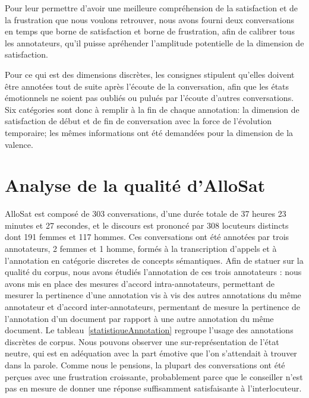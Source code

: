 Pour leur permettre d'avoir une meilleure compréhension de la satisfaction et de la frustration que nous voulons retrouver, nous avons fourni deux conversations en temps que borne de satisfaction et borne de frustration, afin de calibrer tous les annotateurs, qu'il puisse apréhender l'amplitude potentielle de la dimension de satisfaction.

Pour ce qui est des dimensions discrètes, les consignes stipulent qu'elles doivent être annotées tout de suite après l'écoute de la conversation, afin que les états émotionnels ne soient pas oubliés ou pulués par l'écoute d'autres conversations.
Six catégories sont donc à remplir à la fin de chaque annotation: la dimension de satisfaction de début et de fin de conversation avec la force de l'évolution temporaire; les mêmes informations ont été demandées pour la dimension de la valence.

\section{Analyse de la qualité d'AlloSat}
AlloSat est composé de 303 conversations, d'une durée totale de 37 heures 23 minutes et 27 secondes, et le discours est prononcé par 308 locuteurs distincts dont 191 femmes et 117 hommes.
Ces conversations ont été annotées par trois annotateurs, 2 femmes et 1 homme, formés à la transcription d'appels et à l'annotation en catégorie discretes de concepts sémantiques.
Afin de statuer sur la qualité du corpus, nous avons étudiés l'annotation de ces trois annotateurs : nous avons mis en place des mesures d'accord intra-annotateurs, permettant de mesurer la pertinence d'une annotation vis à vis des autres annotations du même annotateur et d'accord inter-annotateurs, permentant de mesure la pertinence de l'annotation d'un document par rapport à une autre annotation du même document.
Le tableau~\ref{statistiqueAnnotation} regroupe l'usage des annotations discrètes de corpus. Nous pouvons observer une sur-représentation de l'état neutre, qui est en adéquation avec la part émotive que l'on s'attendait à trouver dans la parole. Comme nous le pensions, la plupart des conversations ont été perçues avec une frustration croissante, probablement parce que le conseiller n’est pas en mesure de donner une réponse suffisamment satisfaisante à l’interlocuteur.

